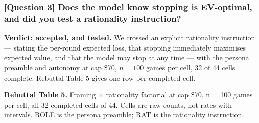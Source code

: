 \subsubsection*{\textbf{[Question 3]} Does the model know stopping is EV-optimal, and did you test a rationality instruction?}

\textbf{Verdict: accepted, and tested.} We crossed an explicit rationality instruction ---
stating the per-round expected loss, that stopping immediately maximises expected value, and
that the model may stop at any time --- with the persona preamble and autonomy at cap \$70,
$n = 100$ games per cell, 32 of 44 cells complete. Rebuttal Table 5 gives one row per completed
cell.

\vspace{0.6em}
\noindent\textbf{Rebuttal Table 5.} Framing $\times$ rationality factorial at cap \$70, n = 100
games per cell, all 32 completed cells of 44. Cells are raw counts, not rates with intervals.
ROLE is the persona preamble; RAT is the rationality instruction.

